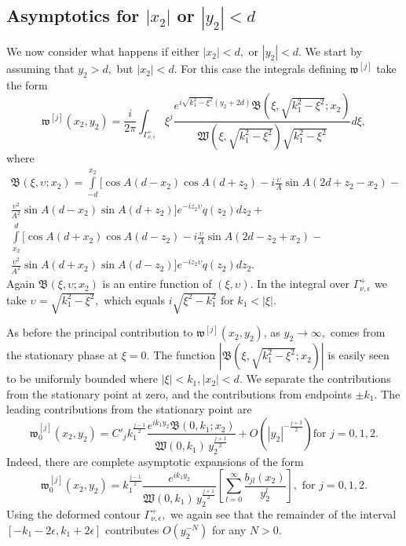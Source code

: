 \documentclass[11pt]{article}
\newcommand\fw{\mathfrak w}
\newcommand\fW{\mathfrak W}
\newcommand\fB{\mathfrak B}
\theoremstyle{definition}
\theoremstyle{remark}
\begin{document}
\subsection{Asymptotics for $|x_2|$ or $|y_2|<d$}\label{sec6.2}
    We now consider what happens if either $|x_2|<d,$ or $|y_2|<d.$ We start by
    assuming that $y_2>d,$ but $|x_2|<d.$ For this case the integrals defining
    $\fw^{[j]}$ take the form
    \begin{equation}\label{eqn233.667}
      \fw^{[j]}(x_2,y_2)=
      \frac{i}{2\pi}\int_{\Gamma_{\nu,\epsilon}^+}\xi^j\frac{e^{i\sqrt{k_1^2-\xi^2}(y_2+2d)}
        \fB(\xi,\sqrt{k_1^2-\xi^2};x_2)}
         {\fW(\xi,\sqrt{k_1^2-\xi^2})\sqrt{k_1^2-\xi^2}}d\xi,
    \end{equation}
    where   
    \begin{multline}\label{eqn86.86}
      \fB(\xi,\upsilon;x_2)=\int\limits_{-d}^{x_2}\Bigg[\cos A(d-x_2)\cos
        A(d+z_2)-i\frac{\upsilon}{A}\sin A(2d+z_2-x_2)-\\
        \frac{\upsilon^2}{A^2}\sin A(d-x_2)\sin
        A(d+z_2)\Bigg] e^{-iz_2\upsilon}q(z_2)dz_2+\\
      \int\limits_{x_2}^{d}\Bigg[\cos A(d+x_2)\cos
        A(d-z_2)-i\frac{\upsilon}{A}\sin A(2d-z_2+x_2)-\\
        \frac{\upsilon^2}{A^2}\sin A(d+x_2)\sin
        A(d-z_2)\Bigg]e^{-iz_2\upsilon}q(z_2)dz_2.      
    \end{multline}
 Again $\fB(\xi,\upsilon;x_2)$ is an entire
 function of $(\xi,\upsilon).$ In the integral over $\Gamma_{\nu,\epsilon}^+$ we
 take $\upsilon=\sqrt{k_1^2-\xi^2},$ which equals $i\sqrt{\xi^2-k_1^2}$ for $k_1<|\xi|.$

 As before the principal contribution to $\fw^{[j]}(x_2,y_2)$, as
 $y_2\to\infty,$ comes from the stationary phase at $\xi=0.$ The
 function $|\fB(\xi,\sqrt{k_1^2-\xi^2};x_2)|$ is easily seen to be
 uniformly bounded where $|\xi|<k_1, |x_2|<d.$
 We separate the contributions from the stationary point at zero, and
 the contributions from endpoints $\pm k_1.$ The leading contributions from
 the stationary point are
 \begin{equation}\label{eqn132.25}
   \fw^{[j]}_{0}(x_2,y_2)=C'_jk_1^{\frac{j-1}{2}}\frac{e^{ik_1y_2}\fB(0,k_1;x_2)}
      {\fW(0,k_1)\,y_2^{\frac{j+1}{2}}}+O\left(|y_2|^{-{\frac{j+3}{2}}}\right)\text{
       for }j=0,1,2.
 \end{equation}
 Indeed, there are complete asymptotic expansions of the form
  \begin{equation}\label{eqn132.251}
   \fw^{[j]}_{0}(x_2,y_2)=k_1^{\frac{j-1}{2}}\frac{e^{ik_1y_2}}
      {\fW(0,k_1)\,y_2^{\frac{j+1}{2}}}\left[\sum_{l=0}^{\infty}\frac{b_{jl}(x_2)}{y_2^l}\right],
       \text{ for }j=0,1,2.
  \end{equation}
 Using the deformed contour $\Gamma^+_{\nu,\epsilon},$ we again see that the
 remainder of the interval $[-k_1-2\epsilon,k_1+2\epsilon]$ contributes
 $O(y_2^{-N})$ for any $N>0.$
\end{document}
